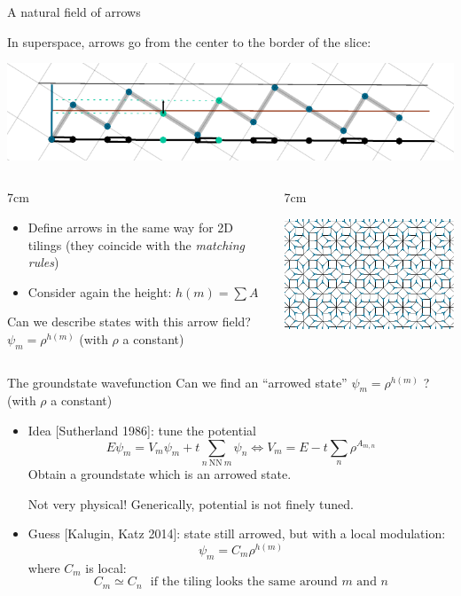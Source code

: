 \documentclass[xcolor=x11names,compress,professionalfonts, aspectratio=169]{beamer}
\renewcommand{\(}{\begin{columns}}
\renewcommand{\)}{\end{columns}}
\newcommand{\<}[1]{\begin{column}{#1}}
\renewcommand{\>}{\end{column}}
\begin{document}
\begin{frame}{A natural field of arrows}

In superspace, arrows go from the center to the border of the slice:

{\centering
\includegraphics[scale=.8]{img/cut_and_project_arrows.pdf}

}

\begin{columns}
\<{7cm}
\begin{itemize}
	\item Define arrows in the same way for 2D tilings (they coincide with the \emph{matching rules})
	\item Consider again the height: $h(m) = \sum A$
\end{itemize}
	Can we describe states with this arrow field? $\psi_m = \rho^{h(m)}$ (with $\rho$ a constant)
\>
\<{7cm}
{\centering
\includegraphics[scale=1.]{img/arrowed_tiling_excerpt.pdf}

}
\>
\end{columns}

\end{frame}

\begin{frame}{The groundstate wavefunction}
Can we find an ``arrowed state'' $\psi_m = \rho^{h(m)}$ ? (with $\rho$ a constant)
\begin{itemize}
\item Idea [Sutherland 1986]: tune the potential
\[
	E \psi_m = V_m \psi_m + t \sum_{n ~\text{NN}~m} \psi_n \Longleftrightarrow V_m = E - t\sum_n \rho^{A_{m,n}}
\]
Obtain a groundstate which is an arrowed state.

Not very physical! Generically, potential is not finely tuned.

\item Guess [Kalugin, Katz 2014]: state still arrowed, but with a local modulation:
\[
	\psi_m = C_{m} \rho^{h(m)}
\]
where $C_m$ is local:
\[
	C_m \simeq C_n \text{~ if the tiling looks the same around $m$ and $n$}
\]
\end{itemize}
\end{frame}
\end{document}
